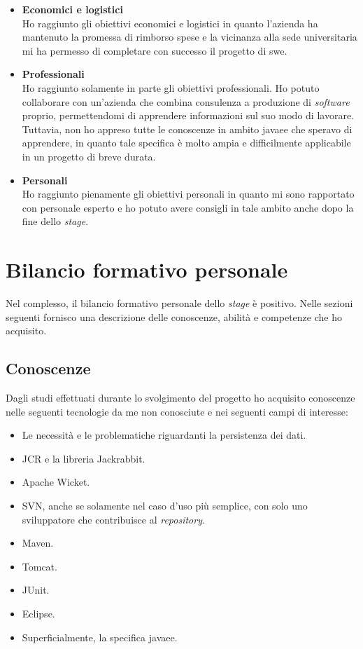 		\begin{itemize}
			\item \textbf{Economici e logistici} \greencheck \\
				Ho raggiunto gli obiettivi economici e logistici in quanto l'azienda ha mantenuto la promessa di rimborso spese e la vicinanza alla sede universitaria mi ha permesso di completare con successo il progetto di \gls{swe}. 
			\item \textbf{Professionali} \yellowcheck \\
				Ho raggiunto solamente in parte gli obiettivi professionali. Ho potuto collaborare con un'azienda che combina consulenza a produzione di \textit{software} proprio, permettendomi di apprendere informazioni sul suo modo di lavorare. Tuttavia, non ho appreso tutte le conoscenze in ambito \gls{javaee} che speravo di apprendere, in quanto tale specifica è molto ampia e difficilmente applicabile in un progetto di breve durata.
			\item \textbf{Personali} \greencheck \\
				Ho raggiunto pienamente gli obiettivi personali in quanto mi sono rapportato con personale esperto e ho potuto avere consigli in tale ambito anche dopo la fine dello \textit{stage}.
		\end{itemize}
	
\section{Bilancio formativo personale}
	Nel complesso, il bilancio formativo personale dello \textit{stage} è positivo. Nelle sezioni seguenti fornisco una descrizione delle conoscenze, abilità e competenze che ho acquisito.
	\subsection{Conoscenze}
		Dagli studi effettuati durante lo svolgimento del progetto ho acquisito conoscenze nelle seguenti tecnologie da me non conosciute e nei seguenti campi di interesse:
		\begin{itemize}
			\item Le necessità e le problematiche riguardanti la persistenza dei dati.
			\item JCR e la libreria Jackrabbit.
			\item Apache Wicket.
			\item SVN, anche se solamente nel caso d'uso più semplice, con solo uno sviluppatore che contribuisce al \textit{repository}.
			\item Maven.
			\item Tomcat.
			\item JUnit.
			\item Eclipse.
			\item Superficialmente, la specifica \gls{javaee}.
		\end{itemize}
		

